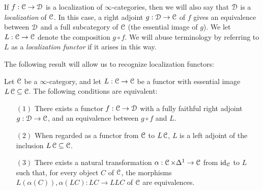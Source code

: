 If $f: \operatorname{\mathcal{C}} \rightarrow \operatorname{\mathcal{D}}$ is a localization of $\infty$-categories, then we will also say that $\operatorname{\mathcal{D}}$ is a {\it localization} of $\operatorname{\mathcal{C}}$. In this case, a right adjoint $g: \operatorname{\mathcal{D}} \rightarrow \operatorname{\mathcal{C}}$
of $f$ gives an equivalence between $\operatorname{\mathcal{D}}$ and a full subcategory of $\operatorname{\mathcal{C}}$ (the essential image of $g$). We let $L: \operatorname{\mathcal{C}} \rightarrow \operatorname{\mathcal{C}}$ denote the composition $g \circ f$. We will abuse terminology by referring to $L$ as a {\it localization functor} if it arises in this way.

The following result will allow us to recognize localization functors:

\begin{proposition}\label{recloc}
Let $\operatorname{\mathcal{C}}$ be a $\infty$-category, and let $L: \operatorname{\mathcal{C}} \rightarrow \operatorname{\mathcal{C}}$ be a functor with essential
image $L\operatorname{\mathcal{C}} \subseteq \operatorname{\mathcal{C}}$. The following conditions are equivalent:
\begin{itemize}
\item[$(1)$] There exists a functor $f: \operatorname{\mathcal{C}} \rightarrow \operatorname{\mathcal{D}}$ with a fully faithful 
right adjoint $g: \operatorname{\mathcal{D}} \rightarrow \operatorname{\mathcal{C}}$, and an equivalence between $g \circ f$ and $L$.

\item[$(2)$] When regarded as a functor from $\operatorname{\mathcal{C}}$ to $L\operatorname{\mathcal{C}}$, $L$ is a left adjoint of the
inclusion $L\operatorname{\mathcal{C}} \subseteq \operatorname{\mathcal{C}}$.

\item[$(3)$] There exists a natural transformation $\alpha: \operatorname{\mathcal{C}} \times \Delta^1 \rightarrow \operatorname{\mathcal{C}}$ from $\operatorname{id}_{\operatorname{\mathcal{C}}}$ to $L$ such that, for every object $C$ of $\operatorname{\mathcal{C}}$, the morphisms
$L(\alpha(C)), \alpha(LC): LC \rightarrow LLC$ of $\operatorname{\mathcal{C}}$ are equivalences.
\end{itemize}
\end{proposition}

